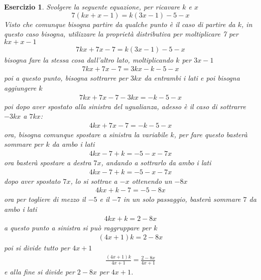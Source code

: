 \documentclass{book}
\newtheorem{es}[section]{Esercizio}
\begin{document}
\begin{es}
  Svolgere la seguente equazione, per ricavare $k$ e $x$
  \begin{equation}
    \label{eq:esercizio4}
    7(kx+x-1)=k(3x-1)-5-x
  \end{equation}
  Visto che comunque bisogna partire da qualche punto è il caso di partire da $k$,
  in questo caso bisogna, utilizzare la proprietà distributiva per moltiplicare
  7 per $kx+x-1$
  \begin{eqnarray*}
    7kx+7x-7=k(3x-1)-5-x
  \end{eqnarray*}
  bisogna fare la stessa cosa dall'altro lato, moltiplicando $k$ per $3x-1$
  \begin{eqnarray*}
    7kx+7x-7=3kx-k-5-x
  \end{eqnarray*}
  poi a questo punto, bisogna sottrarre per $3kx$ da entrambi i lati e poi bisogna
  aggiungere $k$
  \begin{eqnarray*}
    7kx+7x-7-3kx=-k-5-x
  \end{eqnarray*}
  poi dopo aver spostato alla sinistra del ugualianza, adesso è il caso
  di sottrarre $-3kx$ a $7kx$:
  \begin{eqnarray*}
    4kx+7x-7=-k-5-x
  \end{eqnarray*}
  ora, bisogna comunque spostare a sinistra la variabile $k$, per fare questo
  basterà sommare per $k$ da ambo i lati
  \begin{eqnarray*}
    4kx-7+k=-5-x-7x
  \end{eqnarray*}
  ora basterà spostare a destra $7x$, andando a sottrarlo da ambo i lati
  \begin{eqnarray*}
    4kx-7+k=-5-x-7x
  \end{eqnarray*}
  dopo aver spostato $7x$, lo si sottrae a $-x$ ottenendo un $-8x$
  \begin{eqnarray*}
    4kx+k-7=-5-8x
  \end{eqnarray*}
  ora per togliere di mezzo il $-5$ e il $-7$ in un solo passaggio, basterà
  sommare $7$ da ambo i lati
  \begin{eqnarray*}
    4kx+k = 2-8x
  \end{eqnarray*}
  a questo punto a sinistra si può raggruppare per $k$
  \begin{eqnarray*}
    (4x+1)k=2-8x
  \end{eqnarray*}
  poi si divide tutto per $4x+1$
  \begin{eqnarray*}
    \frac{(4x+1)k}{4x+1}=\frac{2-8x}{4x+1}
  \end{eqnarray*}
  e alla fine si divide per $2-8x$ per $4x+1$.

\end{es}
\end{document}
